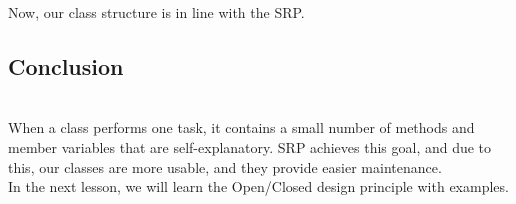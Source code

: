 Now, our class structure is in line with the SRP.

\subsection{Conclusion}\label{hG2zWqLL-pb5SGdZw8IN7}
\\
When a class performs one task, it contains a small number of methods and member variables that are self-explanatory. SRP achieves this goal, and due to this, our classes are more usable, and they provide easier maintenance.
\\
In the next lesson, we will learn the Open/Closed design principle with examples.

